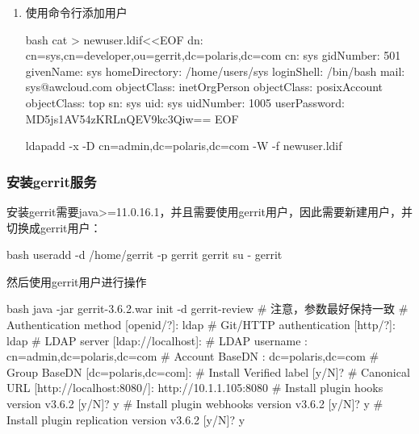 \begin{enumerate}
\begin{code-block}{bash}
  # 修改phpldapadmin /etc/phpldapadmin/config.php
  # 397行取消注释，398行注释掉，如下
  # $servers->setValue('login','attr','dn');
  # $servers->setValue('login','attr','uid');

  # 修改/etc/httpd/conf.d/phpldapadmin.conf，如下
  # <IfModule mod_authz_core.c>
  #   Require local
  #   Require ip 172.16.0.0/16
  # 允许所有地址访问
  #   Require all granted
  # </IfModule>

  # 启动httpd
  systemctl start httpd
  systemctl enable httpd

  # 使用浏览器访问http://<ip>/ldapadmin，用户名/密码cn=admin,dc=polaris,dc=com/passwd
  \end{code-block}

  \item 使用命令行添加用户
  \begin{code-block}{bash}
  cat > newuser.ldif<<EOF
  dn: cn=sys,cn=developer,ou=gerrit,dc=polaris,dc=com
  cn: sys
  gidNumber: 501
  givenName: sys
  homeDirectory: /home/users/sys
  loginShell: /bin/bash
  mail: sys@awcloud.com
  objectClass: inetOrgPerson
  objectClass: posixAccount
  objectClass: top
  sn: sys
  uid: sys
  uidNumber: 1005
  userPassword: {MD5}js1AV54zKRLnQEV9kc3Qiw==
  EOF

  ldapadd -x -D cn=admin,dc=polaris,dc=com -W -f newuser.ldif
  \end{code-block}


\end{enumerate}

\subsubsection{安装gerrit服务}
安装gerrit需要java>=11.0.16.1，并且需要使用gerrit用户，因此需要新建用户，并切换成gerrit用户：
\begin{code-block}{bash}
useradd -d /home/gerrit  -p gerrit  gerrit
su - gerrit
\end{code-block}

然后使用gerrit用户进行操作
\begin{code-block}{bash}
java -jar gerrit-3.6.2.war init -d gerrit-review
# 注意，参数最好保持一致
# Authentication method          [openid/?]: ldap
# Git/HTTP authentication        [http/?]: ldap
# LDAP server                    [ldap://localhost]:
# LDAP username                  : cn=admin,dc=polaris,dc=com
# Account BaseDN                 : dc=polaris,dc=com
# Group BaseDN                   [dc=polaris,dc=com]:
# Install Verified label         [y/N]?
# Canonical URL                  [http://localhost:8080/]: http://10.1.1.105:8080
# Install plugin hooks version v3.6.2 [y/N]? y
# Install plugin webhooks version v3.6.2 [y/N]? y
# Install plugin replication version v3.6.2 [y/N]? y
\end{code-block}


